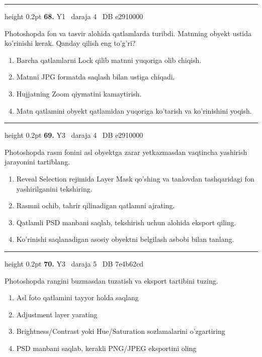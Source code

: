 \documentclass[10pt,a4paper,oneside]{article}
\begin{document}
\vspace{2mm}\hrule height 0.2pt \vspace{4mm}
\hypertarget{q68}{\textbf{\color{ink}68.}}  {\color{muted}\scriptsize Y1 \textbullet\ daraja 4 \textbullet\ DB e2910000}
\par
Photoshopda fon va tasvir alohida qatlamlarda turibdi. Matnning obyekt ustida ko'rinishi kerak. Qanday qilish eng to'g'ri?
\begin{enumerate}[label=\Alph*),leftmargin=9mm]
\item Barcha qatlamlarni Lock qilib matnni yuqoriga olib chiqish.
\item Matnni JPG formatda saqlash bilan ustiga chiqadi.
\item Hujjatning Zoom qiymatini kamaytirish.
\item Matn qatlamini obyekt qatlamidan yuqoriga ko'tarish va ko'rinishini yoqish.
\end{enumerate}
\vspace{2mm}\hrule height 0.2pt \vspace{4mm}
\hypertarget{q69}{\textbf{\color{ink}69.}}  {\color{muted}\scriptsize Y3 \textbullet\ daraja 4 \textbullet\ DB e2910000}
\par
Photoshopda rasm fonini asl obyektga zarar yetkazmasdan vaqtincha yashirish jarayonini tartiblang.
\begin{enumerate}[label=\Alph*),leftmargin=9mm]
\item Reveal Selection rejimida Layer Mask qo'shing va tanlovdan tashqaridagi fon yashirilganini tekshiring.
\item Rasmni ochib, tahrir qilinadigan qatlamni ajrating.
\item Qatlamli PSD manbani saqlab, tekshirish uchun alohida eksport qiling.
\item Ko'rinishi saqlanadigan asosiy obyektni belgilash asbobi bilan tanlang.
\end{enumerate}
\vspace{2mm}\hrule height 0.2pt \vspace{4mm}
\hypertarget{q70}{\textbf{\color{ink}70.}}  {\color{muted}\scriptsize Y3 \textbullet\ daraja 5 \textbullet\ DB 7e4b62cd}
\par
Photoshopda rangini buzmasdan tuzatish va eksport tartibini tuzing.
\begin{enumerate}[label=\Alph*),leftmargin=9mm]
\item Asl foto qatlamini tayyor holda saqlang
\item Adjustment layer yarating
\item Brightness/Contrast yoki Hue/Saturation sozlamalarini o'zgartiring
\item PSD manbani saqlab, kerakli PNG/JPEG eksportini oling
\end{enumerate}
\end{document}
